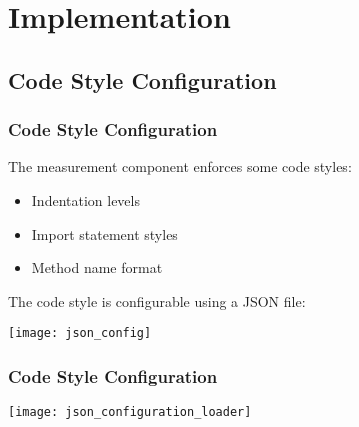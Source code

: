 \section{Implementation}

\subsection{Code Style Configuration}
\begin{frame}
\frametitle{Code Style Configuration}

The measurement component enforces some code styles:

\begin{itemize}
  \item Indentation levels
  \item Import statement styles
  \item Method name format
\end{itemize}

The code style is configurable using a JSON file:

\texttt{[image: json\_config]}

\end{frame}

\begin{frame}
\frametitle{Code Style Configuration}

\texttt{[image: json\_configuration\_loader]}


\end{frame}

